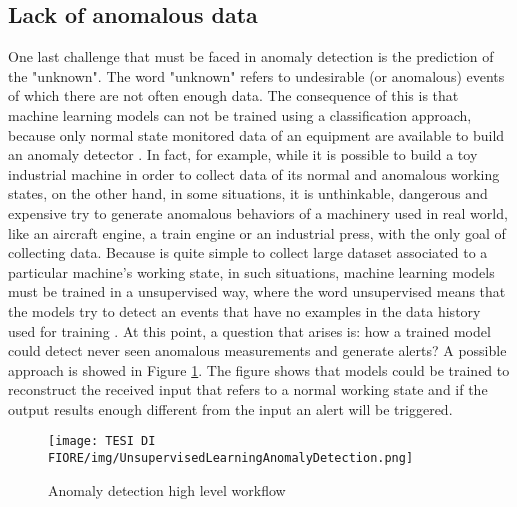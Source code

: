 \subsection{Lack of anomalous data}
One last challenge that must be faced in anomaly detection is the prediction of the "unknown". The word "unknown" refers to undesirable (or anomalous) events of which there are not often enough data. The consequence of this is that machine learning models can not be trained using a classification approach, because only normal state monitored data of an equipment are available to build an anomaly detector \cite{7AnomalyDetectionUnsupervised}. In fact, for example, while it is possible to build a toy industrial machine in order to collect data of its normal and anomalous working states, on the other hand, in some situations, it is unthinkable, dangerous and expensive try to generate anomalous behaviors of a machinery used in real world, like an aircraft engine, a train engine or an industrial press, with the only goal of collecting data. Because is quite simple to collect large dataset associated to a particular machine's working state, in such situations, machine learning models must be trained in a unsupervised way, where the word unsupervised means that the models try to detect an events that have no examples in the data history used for training \cite{8AnomalyDetectionUnsupervised2}. At this point, a question that arises is: how a trained model could detect never seen anomalous measurements and generate alerts? A possible approach is showed in Figure \ref{scoring_system_approach}. The figure shows that models could be trained to reconstruct the received input that refers to a normal working state and if the output results enough different from the input an alert will be triggered.

\begin{figure}[ht]
\texttt{[image: TESI DI FIORE/img/UnsupervisedLearningAnomalyDetection.png]}
\centering
\caption{Anomaly detection high level workflow \cite{7AnomalyDetectionUnsupervised}}
\label{scoring_system_approach}
\end{figure}


